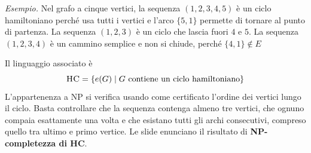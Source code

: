 \medskip
\noindent
\textit{Esempio.} Nel grafo a cinque vertici, la sequenza
$(1,2,3,4,5)$ è un ciclo hamiltoniano perché usa tutti i vertici
e l'arco $\{5,1\}$ permette di tornare al punto di partenza.
La sequenza $(1,2,3)$ è un ciclo che lascia fuori $4$ e $5$.
La sequenza $(1,2,3,4)$ è un cammino semplice e non si chiude,
perché $\{4,1\}\notin E$

\medskip
\noindent
Il linguaggio associato è
\[
    \textsc{HC}=\{e(G)\mid G\text{ contiene un ciclo hamiltoniano}\}
\]
L'appartenenza a NP si verifica usando come certificato
l'ordine dei vertici lungo il ciclo. Basta controllare che
la sequenza contenga almeno tre vertici, che ognuno compaia
esattamente una volta e che esistano tutti gli archi consecutivi,
compreso quello tra ultimo e primo vertice. Le slide enunciano
il risultato di \textbf{NP-completezza di HC}.
